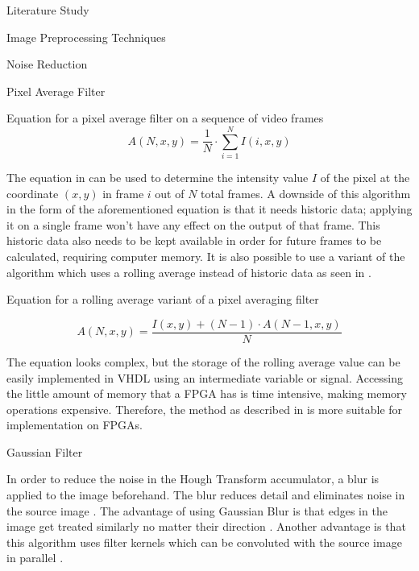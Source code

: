 \documentclass{matthijs}
\begin{document}
\begin{hoofdstuk}{Literature Study}
\begin{paragraaf}{Image Preprocessing Techniques}
\begin{subparagraaf}{Noise Reduction}
\begin{subsubparagraaf}{Pixel Average Filter}
\begin{figuur}{Equation for a pixel average filter on a sequence of video frames}
						\begin{equation*}
							A (N, x, y) = \frac{1}{N} \cdot \sum_{i=1}^{N} I (i, x, y)
						\end{equation*}\cite{spring2001image}
					
					\end{figuur}

					The equation in  can be used to determine the intensity value $I$ of the pixel at the coordinate $(x,y)$ in frame $i$ out of $N$ total frames.
					A downside of this algorithm in the form of the aforementioned equation is that it needs historic data; applying it on a single frame won't have any effect on the output of that frame.
					This historic data also needs to be kept available in order for future frames to be calculated, requiring computer memory.
					It is also possible to use a variant of the algorithm which uses a rolling average instead of historic data \cite{spring2001image} as seen in .

					\begin{figuur}{Equation for a rolling average variant of a pixel averaging filter}

						\begin{equation*}
							A (N, x, y) = \frac{I (x, y) + (N - 1) \cdot A (N - 1, x, y)}{N}
						\end{equation*}\cite{spring2001image}
					
					\end{figuur}

					The equation looks complex, but the storage of the rolling average value can be easily implemented in VHDL using an intermediate variable or signal.
					Accessing the little amount of memory that a FPGA has is time intensive, making memory operations expensive.
					Therefore, the method as described in  is more suitable for implementation on FPGAs.
				
				\end{subsubparagraaf}

				\begin{subsubparagraaf}{Gaussian Filter}

					In order to reduce the noise in the Hough Transform accumulator, a blur is applied to the image beforehand.
					The blur reduces detail and eliminates noise in the source image \cite{fan2016faster}.
					The advantage of using Gaussian Blur is that edges in the image get treated similarly no matter their direction \cite{waltz1998efficient}.
					Another advantage is that this algorithm uses filter kernels which can be convoluted with the source image in parallel \cite{stroem2016parallel}.
					

\end{subsubparagraaf}
\end{subparagraaf}
\end{paragraaf}
\end{hoofdstuk}
\end{document}
